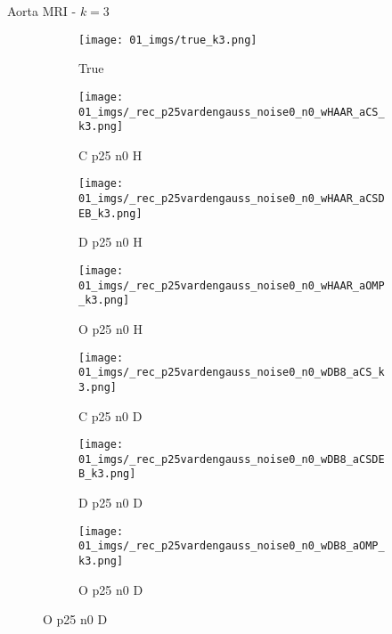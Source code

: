 \begin{frame}{Aorta MRI - $k=3$}{}
\begin{figure}
\begin{subfigure}{0.13\textwidth}
\texttt{[image: 01\_imgs/true\_k3.png]}
\caption*{\tiny True}
\end{subfigure}
\begin{subfigure}{0.13\textwidth}
\texttt{[image: 01\_imgs/\_rec\_p25vardengauss\_noise0\_n0\_wHAAR\_aCS\_k3.png]}
\caption*{\tiny C p25 n0 H}
\end{subfigure}
\begin{subfigure}{0.13\textwidth}
\texttt{[image: 01\_imgs/\_rec\_p25vardengauss\_noise0\_n0\_wHAAR\_aCSDEB\_k3.png]}
\caption*{\tiny D p25 n0 H}
\end{subfigure}
\begin{subfigure}{0.13\textwidth}
\texttt{[image: 01\_imgs/\_rec\_p25vardengauss\_noise0\_n0\_wHAAR\_aOMP\_k3.png]}
\caption*{\tiny O p25 n0 H}
\end{subfigure}
\begin{subfigure}{0.13\textwidth}
\texttt{[image: 01\_imgs/\_rec\_p25vardengauss\_noise0\_n0\_wDB8\_aCS\_k3.png]}
\caption*{\tiny C p25 n0 D}
\end{subfigure}
\begin{subfigure}{0.13\textwidth}
\texttt{[image: 01\_imgs/\_rec\_p25vardengauss\_noise0\_n0\_wDB8\_aCSDEB\_k3.png]}
\caption*{\tiny D p25 n0 D}
\end{subfigure}
\begin{subfigure}{0.13\textwidth}
\texttt{[image: 01\_imgs/\_rec\_p25vardengauss\_noise0\_n0\_wDB8\_aOMP\_k3.png]}
\caption*{\tiny O p25 n0 D}
\end{subfigure}

\vspace{5pt}


\end{figure}
\end{frame}
